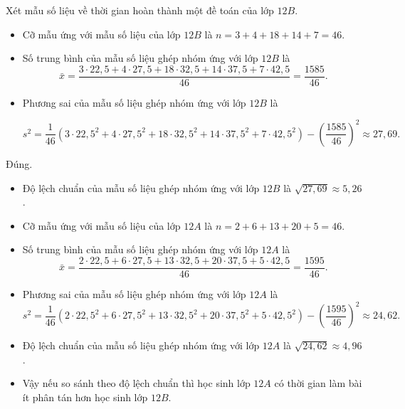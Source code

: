 \begin{ex}
{\begin{itemchoice}
  Xét mẫu số liệu về thời gian hoàn thành một đề toán của lớp $12B$.
  \begin{itemize}
  	\item 	Cỡ mẫu ứng với mẫu số liệu của lớp $12B$ là $n=3+4+18+14+7=46$.
  	\item   Số trung bình của mẫu số liệu ghép nhóm ứng với lớp $12B$ là
    $$
  \bar{x}=\dfrac{3\cdot 22{,}5+4\cdot 27{,}5+18\cdot 32{,}5+14\cdot 37{,}5+7\cdot 42{,}5}{46}=\dfrac{1585}{46}.
  $$	
  	\item	Phương sai của mẫu số liệu ghép nhóm ứng với lớp $12B$ là
  
  $$
  s^2=\dfrac{1}{46}\left(3\cdot 22{,}5^2+4\cdot 27{,}5^2+18\cdot 32{,}5^2+14\cdot 37{,}5^2+7\cdot 42{,}5^2\right)-\left(\dfrac{1585}{46}\right)^2 \approx 27{,}69.
  $$
  \end{itemize}		
\itemch Đúng.
\begin{itemize}
	\item  Độ lệch chuẩn của mẫu số liệu ghép nhóm ứng với lớp $12B$ là $\sqrt{27{,}69} \approx 5{,}26$.
	\item Cỡ mẫu ứng với mẫu số liệu của lớp $12A$ là $n=2+6+13+20+5=46$.
		\item	Số trung bình của mẫu số liệu ghép nhóm ứng với lớp $12A$ là
	$$
	\bar{x}=\dfrac{2 \cdot 22{,}5+6\cdot 27{,}5+13\cdot 32{,}5+20\cdot 37{,}5+5\cdot 42{,}5}{46}=\dfrac{1595}{46}.
	$$
		\item	Phương sai của mẫu số liệu ghép nhóm ứng với lớp $12A$ là
		$$
	s^2=\dfrac{1}{46}\left(2\cdot 22{,}5^2+6\cdot 27{,}5^2+13\cdot 32{,}5^2+20\cdot 37{,}5^2+5\cdot 42{,}5^2\right)-\left(\dfrac{1595}{46}\right)^2 \approx 24{,}62.
	$$
		\item 	Độ lệch chuẩn của mẫu số liệu ghép nhóm ứng với lớp $12A$ là $\sqrt{24,62} \approx 4{,}96$.
		\item Vậy nếu so sánh theo độ lệch chuẩn thì học sinh lớp $12A$ có thời gian làm bài ít phân tán hơn học sinh lớp $12B$.
\end{itemize}
\end{itemchoice}
	}
\end{ex}

